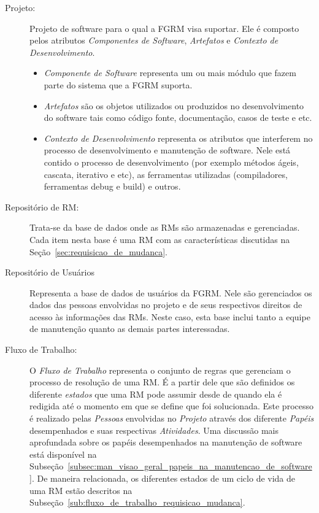 \begin{description}
	\item[Projeto:] Projeto de software para o qual a FGRM visa suportar.
		Ele é composto pelos atributos \textit{Componentes de Software},
		\textit{Artefatos} e \textit{Contexto de Desenvolvimento}.
		\begin{itemize}
			\item  \textit{Componente de Software} representa um ou mais módulo
				que fazem parte do sistema que a FGRM suporta.
			\item \textit{Artefatos} são os objetos utilizados ou produzidos no
				desenvolvimento do software tais como código fonte,
				documentação, casos de teste e etc.
			\item \textit{Contexto de Desenvolvimento} representa os atributos
				que interferem no processo de desenvolvimento e manutenção de
				software. Nele está contido o processo de desenvolvimento (por
				exemplo métodos ágeis, cascata, iterativo e etc), as ferramentas
				utilizadas (compiladores, ferramentas debug e build) e outros.
		\end{itemize}
	\item[Repositório de RM:] Trata-se da base de dados onde as RMs são
		armazenadas e gerenciadas. Cada item nesta base é uma RM com as
		características discutidas na Seção~\ref{sec:requisicao_de_mudanca}.
	\item[Repositório de Usuários] Representa a base de dados de usuários da
		FGRM\@. Nele são gerenciados os dados das pessoas envolvidas no projeto e
		de seus respectivos direitos de acesso às informações das RMs. Neste
		caso, esta base inclui tanto a equipe de manutenção quanto as demais
		partes interessadas.
	\item[Fluxo de Trabalho:] O \textit{Fluxo de Trabalho} representa o conjunto
		de regras que gerenciam o processo de resolução de uma RM\@. É a partir
		dele que são definidos os diferente \textit{estados} que uma RM pode
		assumir desde de quando ela é redigida até o momento em que se define
		que foi solucionada. Este processo é realizado pelas \textit{Pessoas}
		envolvidas no \textit{Projeto} através dos diferente \textit{Papéis}
		desempenhados e suas respectivas \textit{Atividades}. Uma discussão mais
		aprofundada sobre os papéis desempenhados na manutenção de software está
		disponível na
		Subseção~\ref{subsec:man_visao_geral_papeis_na_manutencao_de_software}.
		De maneira relacionada, os diferentes estados de um ciclo de vida de uma
		RM estão descritos na
		Subseção~\ref{sub:fluxo_de_trabalho_requisicao_mudanca}.
\end{description}

